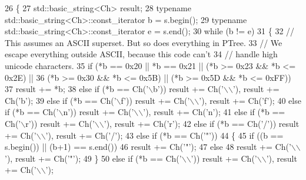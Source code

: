 \begin{DoxyCode}
26 \{
27   std::basic\_string<Ch> result;
28   \textcolor{keyword}{typename} std::basic\_string<Ch>::const\_iterator b = s.begin();
29   \textcolor{keyword}{typename} std::basic\_string<Ch>::const\_iterator e = s.end();
30   \textcolor{keywordflow}{while} (b != e)
31   \{
32     \textcolor{comment}{// This assumes an ASCII superset. But so does everything in PTree.}
33     \textcolor{comment}{// We escape everything outside ASCII, because this code can't}
34     \textcolor{comment}{// handle high unicode characters.}
35     \textcolor{keywordflow}{if} (*b == 0x20 || *b == 0x21 || (*b >= 0x23 && *b <= 0x2E) ||
36         (*b >= 0x30 && *b <= 0x5B) || (*b >= 0x5D && *b <= 0xFF))
37       result += *b;
38     \textcolor{keywordflow}{else} \textcolor{keywordflow}{if} (*b == Ch(\textcolor{charliteral}{'\(\backslash\)b'})) result += Ch(\textcolor{charliteral}{'\(\backslash\)\(\backslash\)'}), result += Ch(\textcolor{charliteral}{'b'});
39     \textcolor{keywordflow}{else} \textcolor{keywordflow}{if} (*b == Ch(\textcolor{charliteral}{'\(\backslash\)f'})) result += Ch(\textcolor{charliteral}{'\(\backslash\)\(\backslash\)'}), result += Ch(\textcolor{charliteral}{'f'});
40     \textcolor{keywordflow}{else} \textcolor{keywordflow}{if} (*b == Ch(\textcolor{charliteral}{'\(\backslash\)n'})) result += Ch(\textcolor{charliteral}{'\(\backslash\)\(\backslash\)'}), result += Ch(\textcolor{charliteral}{'n'});
41     \textcolor{keywordflow}{else} \textcolor{keywordflow}{if} (*b == Ch(\textcolor{charliteral}{'\(\backslash\)r'})) result += Ch(\textcolor{charliteral}{'\(\backslash\)\(\backslash\)'}), result += Ch(\textcolor{charliteral}{'r'});
42     \textcolor{keywordflow}{else} \textcolor{keywordflow}{if} (*b == Ch(\textcolor{charliteral}{'/'})) result += Ch(\textcolor{charliteral}{'\(\backslash\)\(\backslash\)'}), result += Ch(\textcolor{charliteral}{'/'});
43     \textcolor{keywordflow}{else} \textcolor{keywordflow}{if} (*b == Ch(\textcolor{charliteral}{'"'}))
44     \{
45       \textcolor{keywordflow}{if} ((b == s.begin()) || (b+1) == s.end())
46         result += Ch(\textcolor{charliteral}{'"'});
47       \textcolor{keywordflow}{else}
48         result += Ch(\textcolor{charliteral}{'\(\backslash\)\(\backslash\)'}), result += Ch(\textcolor{charliteral}{'"'});
49     \}
50     \textcolor{keywordflow}{else} \textcolor{keywordflow}{if} (*b == Ch(\textcolor{charliteral}{'\(\backslash\)\(\backslash\)'})) result += Ch(\textcolor{charliteral}{'\(\backslash\)\(\backslash\)'}), result += Ch(\textcolor{charliteral}{'\(\backslash\)\(\backslash\)'});

\end{DoxyCode}
